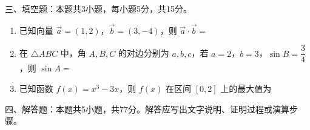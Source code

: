 \documentclass[12pt,a4paper]{article}
\newcommand{\hei}{\CJKfamily{hei}}
\begin{document}
	\vspace{0.5cm}



	{\hei\noindent 三、填空题：本题共3小题，每小题5分，共15分。}

	\vspace{0.3cm}

	\begin{enumerate}[resume]
		\item 已知向量 \( \vec{a} = (1, 2) \)，\( \vec{b} = (3, -4) \)，则 \( \vec{a} \cdot \vec{b} = \)\underline{\hspace{3cm}}

		\item 在 \( \triangle ABC \) 中，角 \( A, B, C \) 的对边分别为 \( a, b, c \)，若 \( a = 2 \)，\( b = 3 \)，\( \sin B = \dfrac{3}{4} \)，则 \( \sin A = \)\underline{\hspace{3cm}}

		\item 已知函数 \( f(x) = x^3 - 3x \)，则 \( f(x) \) 在区间 \( [0, 2] \) 上的最大值为\underline{\hspace{3cm}}
	\end{enumerate}

	\vspace{0.5cm}


	{\hei\noindent 四、解答题：本题共5小题，共77分。解答应写出文字说明、证明过程或演算步骤。}

	\vspace{0.3cm}
\end{document}
